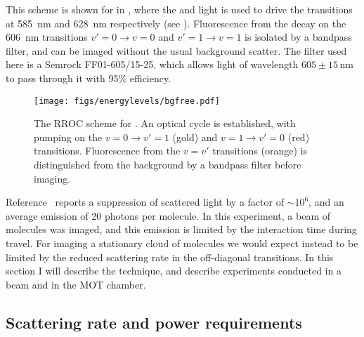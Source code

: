 This scheme is shown for \CaF{} in , where
the  and  light is used to drive the transitions at
\SI{585}{\nano\meter} and \SI{628}{\nano\meter} respectively (see
). Fluorescence from the decay on the
\SI{606}{\nano\meter} transitions $v'=0\rightarrow v=0$ and $v'=1\rightarrow
v=1$ is isolated by a bandpass filter, and can be imaged without the usual
background scatter. The filter used here is a Semrock FF01-605/15-25, which
allows light of wavelength $605\pm{15}\,\si{\nano\meter}$ to pass through it
with 95\% efficiency.

\begin{figure}[htbp]
  \centering
  \texttt{[image: figs/energylevels/bgfree.pdf]}
  \caption[The RROC scheme for \CaF{}]{
  The RROC scheme for \CaF{}. An optical cycle is established, with pumping on
  the $v=0 \rightarrow v'=1$ (gold) and $v=1 \rightarrow v'=0$ (red) transitions.
  Fluorescence from the $v=v'$ transitions (orange) is distinguished from the
  background by a bandpass filter before imaging.
  }
  \label{exper:fig:bgfreelevels}
\end{figure}

Reference~\cite{Shaw2021} reports a suppression of scattered light by a factor
of $\sim10^6$, and an average emission of 20 photons per molecule. In this
experiment, a beam of molecules was imaged, and this emission is limited by the
interaction time during travel. For imaging a stationary cloud of molecules we
would expect instead to be limited by the reduced scattering rate in the
off-diagonal transitions. In this section I will describe the technique, and
describe experiments conducted in a beam and in the MOT chamber.

\subsection{Scattering rate and power requirements}

